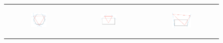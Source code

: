 \documentclass [12pt]{article}
\begin{document}
\begin{enumerate}[label=(\alph*)]
        \begin{figure}[h]
            \begin{tabular}{ccc}
                \begin{subfigure}{0.33\textwidth}
                    \centering
                    \includegraphics[width=0.7\textwidth]{images/supportline3b.PNG}
                    \caption{}
                    \label{fig:supportline3b}
                \end{subfigure} &
                \begin{subfigure}{0.33\textwidth}
                    \centering
                    \includegraphics[width=0.7\textwidth]{images/supportline3a.PNG}
                    \caption{}
                    \label{fig:supportline3a}
                \end{subfigure} & 
                \begin{subfigure}{0.33\textwidth}
                    \centering
                    \includegraphics[width=0.7\textwidth]{images/supportline3c.PNG}

\end{subfigure}
\end{tabular}
\end{figure}
\end{enumerate}
\end{document}
